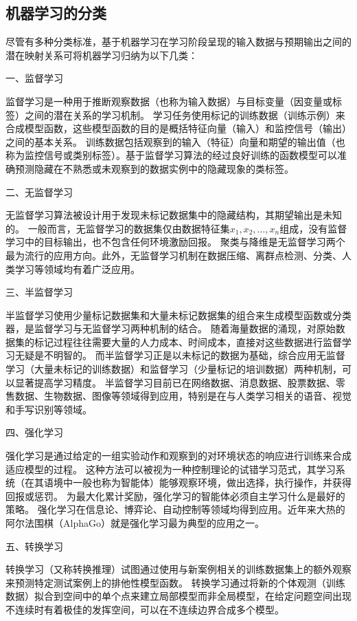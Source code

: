\subsection{机器学习的分类}
尽管有多种分类标准，基于机器学习在学习阶段呈现的输入数据与预期输出之间的潜在映射关系可将机器学习归纳为以下几类\cite{awad2015,Li2017,Aurélien2018}：

一、监督学习

监督学习是一种用于推断观察数据（也称为输入数据）与目标变量（因变量或标签）之间的潜在关系的学习机制。
学习任务使用标记的训练数据（训练示例）来合成模型函数，这些模型函数的目的是概括特征向量（输入）和监控信号（输出）之间的基本关系。
训练数据包括观察到的输入（特征）向量和期望的输出值（也称为监控信号或类别标签）。基于监督学习算法的经过良好训练的函数模型可以准确预测隐藏在不熟悉或未观察到的数据实例中的隐藏现象的类标签。

二、无监督学习

无监督学习算法被设计用于发现未标记数据集中的隐藏结构，其期望输出是未知的。
一般而言，无监督学习的数据集仅由数据特征集$x_1,x_2,\dots,x_n$组成，没有监督学习中的目标输出，也不包含任何环境激励回报。
聚类与降维是无监督学习两个最为流行的应用方向。此外，无监督学习机制在数据压缩、离群点检测、分类、人类学习等领域均有着广泛应用\cite{awad2015}。

三、半监督学习

半监督学习使用少量标记数据集和大量未标记数据集的组合来生成模型函数或分类器，是监督学习与无监督学习两种机制的结合。
随着海量数据的涌现，对原始数据集的标记过程往往需要大量的人力成本、时间成本，直接对这些数据进行监督学习无疑是不明智的。
而半监督学习正是以未标记的数据为基础，综合应用无监督学习（大量未标记的训练数据）和监督学习（少量标记的培训数据）两种机制，可以显著提高学习精度。
半监督学习目前已在网络数据、消息数据、股票数据、零售数据、生物数据、图像等领域得到应用，特别是在与人类学习相关的语音、视觉和手写识别等领域\cite{awad2015,Aurélien2018}。

四、强化学习

强化学习是通过给定的一组实验动作和观察到的对环境状态的响应进行训练来合成适应模型的过程。
这种方法可以被视为一种控制理论的试错学习范式，其学习系统（在其语境中一般也称为智能体）能够观察环境，做出选择，执行操作，并获得回报或惩罚。
为最大化累计奖励，强化学习的智能体必须自主学习什么是最好的策略。
强化学习在信息论、博弈论、自动控制等领域均得到应用。近年来大热的阿尔法围棋（AlphaGo）就是强化学习最为典型的应用之一\cite{Silver2016}。

五、转换学习

转换学习（又称转换推理）试图通过使用与新案例相关的训练数据集上的额外观察来预测特定测试案例上的排他性模型函数。
转换学习通过将新的个体观测（训练数据）拟合到空间中的单个点来建立局部模型而非全局模型，在给定问题空间出现不连续时有着极佳的发挥空间，可以在不连续边界合成多个模型\cite{Silver2016}。

